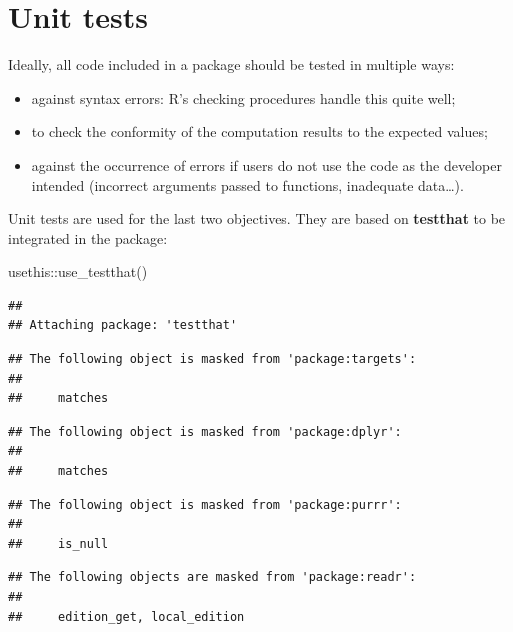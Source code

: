 \documentclass[
  12pt,
  american,
  a4paper,
  extrafontsizes,onecolumn,openright
  ]{memoir}
\newenvironment{Shaded}{\begin{snugshade}}{\end{snugshade}}
\newcommand{\FunctionTok}[1]{\textcolor[rgb]{0.00,0.00,0.00}{#1}}
\newcommand{\NormalTok}[1]{#1}
\newcommand{\SpecialCharTok}[1]{\textcolor[rgb]{0.00,0.00,0.00}{#1}}
\providecommand{\tightlist}{%
  \setlength{\itemsep}{0pt}\setlength{\parskip}{0pt}}
\begin{document}
\hypertarget{unit-tests}{%
\section{Unit tests}\label{unit-tests}}

Ideally, all code included in a package should be tested in multiple ways:

\begin{itemize}
\tightlist
\item
  against syntax errors: R's checking procedures handle this quite well;
\item
  to check the conformity of the computation results to the expected values;
\item
  against the occurrence of errors if users do not use the code as the developer intended (incorrect arguments passed to functions, inadequate data\ldots).
\end{itemize}

Unit tests are used for the last two objectives.
They are based on \textbf{testthat} to be integrated in the package:

\scriptsize

\begin{Shaded}
\begin{Highlighting}[]
\NormalTok{usethis}\SpecialCharTok{::}\FunctionTok{use\_testthat}\NormalTok{()}
\end{Highlighting}
\end{Shaded}

\normalsize

\scriptsize

\begin{verbatim}
## 
## Attaching package: 'testthat'
\end{verbatim}

\begin{verbatim}
## The following object is masked from 'package:targets':
## 
##     matches
\end{verbatim}

\begin{verbatim}
## The following object is masked from 'package:dplyr':
## 
##     matches
\end{verbatim}

\begin{verbatim}
## The following object is masked from 'package:purrr':
## 
##     is_null
\end{verbatim}

\begin{verbatim}
## The following objects are masked from 'package:readr':
## 
##     edition_get, local_edition
\end{verbatim}
\end{document}
